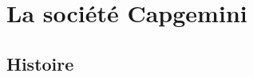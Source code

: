 \chapter{La société Capgemini}
\section{Histoire}
\begin{comment}
\section{Les premiéres années (1967-1975)}
Les racines de Capgemini se trouvent é Grenoble, oé Serge Kampf fonda Sogeti en 1967. En 1975, l'acquisition de 2 importantes sociétés de services IT, CAP et Gemini Computer Systems, fait de l'entreprise un leader en Europe, avec une présence dans 21 pays.

\section{Le temps de l'expansion (1975-1989)}
Le Groupe continue de grandir et de se développer ; son action se concentre sur des domaines allant des solutions d'investissement de capital  aux services intellectuels de qualité. En 1989, restructuration interne, expansion européenne et pénétration du marché américain American permettent é Capgemini de faire partie des 5 leaders mondiaux de ce secteur.
Construire le futur (1998 - aujourd'hui)

Au cours des derniéres années, qui se sont révélées particuliérement difficiles pour le secteur des services informatiques, il est apparu nécessaire de ré-équilibrer le portefeuille déactivités du Groupe en faveur de deux de ses métiers : léassistance technique de proximité et léinfogérance. Léacquisition de Transiciel, fin 2003, a permis é Capgemini de doubler la taille de Sogeti, léentité créée en 2001 dans le domaine de léassistance technique. Aujourdéhui Sogeti, qui représente 15%
Nous avons également développé une approche baptisée Rightshoreé, qui s'appuie é la fois sur les capacités offshore  éavec notamment 20 500  collaborateurs basés en Inde en 2009, suite é l'acquisition of Kanbay, ainsi que des centres offshore au Maroc et en Argentine é et sur les ressources nearshore dans des pays incluant la Pologne et l'Espagne.


\end{comment}
